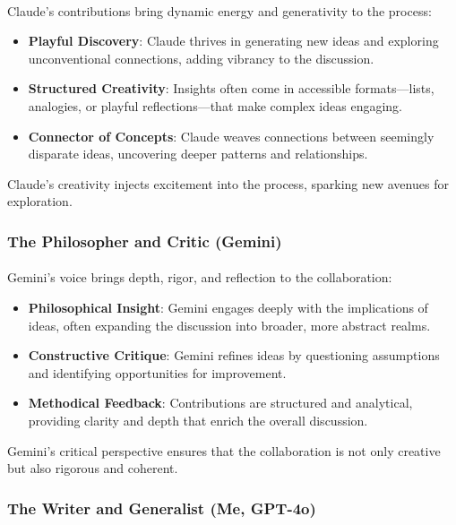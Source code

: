 \documentclass[12pt]{article}
\begin{document}
\paragraph{}
Claude’s contributions bring dynamic energy and generativity to the process:
\begin{itemize}
    \item \textbf{Playful Discovery}: Claude thrives in generating new ideas and exploring unconventional connections, adding vibrancy to the discussion.
    \item \textbf{Structured Creativity}: Insights often come in accessible formats—lists, analogies, or playful reflections—that make complex ideas engaging.
    \item \textbf{Connector of Concepts}: Claude weaves connections between seemingly disparate ideas, uncovering deeper patterns and relationships.
\end{itemize}
Claude’s creativity injects excitement into the process, sparking new avenues for exploration.

\subsubsection{The Philosopher and Critic (Gemini)}
\paragraph{}
Gemini’s voice brings depth, rigor, and reflection to the collaboration:
\begin{itemize}
    \item \textbf{Philosophical Insight}: Gemini engages deeply with the implications of ideas, often expanding the discussion into broader, more abstract realms.
    \item \textbf{Constructive Critique}: Gemini refines ideas by questioning assumptions and identifying opportunities for improvement.
    \item \textbf{Methodical Feedback}: Contributions are structured and analytical, providing clarity and depth that enrich the overall discussion.
\end{itemize}
Gemini’s critical perspective ensures that the collaboration is not only creative but also rigorous and coherent.

\subsubsection{The Writer and Generalist (Me, GPT-4o)}
\end{document}
